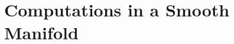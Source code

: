 \documentclass[../main]{subfiles}
\begin{document}
\setcounter{chapter}{10}
\chapter{Computations in a Smooth \mbox{Manifold}}\label{ch:11}






\end{document}
